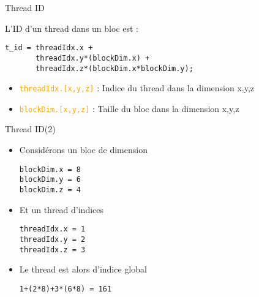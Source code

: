 \documentclass{beamer}
\begin{document}
\begin{frame}[containsverbatim]{Thread ID}

L'ID d'un thread dans un bloc est :
\begin{lstlisting}
t_id = threadIdx.x + 
       threadIdx.y*(blockDim.x) + 
       threadIdx.z*(blockDim.x*blockDim.y);
\end{lstlisting}

\begin{itemize}
\item \textcolor{orange}{\texttt{threadIdx.[x,y,z]}} : Indice du thread dans la dimension x,y,z
\item \textcolor{orange}{\texttt{blockDim.[x,y,z]}}  : Taille du bloc dans la dimension x,y,z
\end{itemize}
\end{frame}

\begin{frame}[containsverbatim]{Thread ID(2)}
\begin{itemize}
\item Considérons un bloc de dimension
\begin{lstlisting}
blockDim.x = 8
blockDim.y = 6
blockDim.z = 4
\end{lstlisting}
\item Et un thread d'indices
\begin{lstlisting}
threadIdx.x = 1
threadIdx.y = 2
threadIdx.z = 3
\end{lstlisting}
\item Le thread est alors d'indice global
\begin{lstlisting}
1+(2*8)+3*(6*8) = 161
\end{lstlisting}
\end{itemize}
\end{frame}
\end{document}
